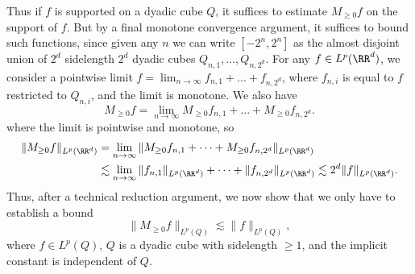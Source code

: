 %
Thus if $f$ is supported on a dyadic cube $Q$, it suffices to estimate $M_{\geq 0} f$ on the support of $f$. But by a final monotone convergence argument, it suffices to bound such functions, since given any $n$ we can write $[-2^n,2^n]$ as the almost disjoint union of $2^d$ sidelength $2^d$ dyadic cubes $Q_{n,1},\dots,Q_{n,2^d}$. For any $f \in L^p(\RR^d)$, we consider a pointwise limit $f = \lim_{n \to \infty} f_{n,1} + \dots + f_{n,2^d}$, where $f_{n,i}$ is equal to $f$ restricted to $Q_{n,i}$, and the limit is monotone. We also have
%
\[ M_{\geq 0} f = \lim_{n \to \infty} M_{\geq 0} f_{n,1} + \dots + M_{\geq 0} f_{n,2^d}. \]
%
where the limit is pointwise and monotone, so
%
\begin{align*}
  \| M_{\geq 0} f \|_{L^p(\RR^d)} &= \lim_{n \to \infty} \| M_{\geq 0} f_{n,1} + \dots + M_{\geq 0} f_{n,2^d} \|_{L^p(\RR^d)}\\
  &\lesssim \lim_{n \to \infty} \| f_{n,1} \|_{L^p(\RR^d)} + \dots + \| f_{n,2^d} \|_{L^p(\RR^d)} \lesssim 2^d \| f \|_{L^p(\RR^d)}.
\end{align*}
%
Thus, after a technical reduction argument, we now show that we only have to establish a bound
%
\[ \| M_{\geq 0} f \|_{L^p(Q)} \lesssim \| f \|_{L^p(Q)}, \]
%
where $f \in L^p(Q)$, $Q$ is a dyadic cube with sidelength $\geq 1$, and the implicit constant is independent of $Q$.


